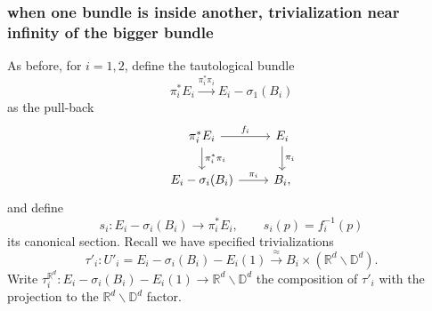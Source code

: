 \documentclass[11pt]{article}
\theoremstyle{definition}
\theoremstyle{remark}
\def\R{\mathbb{R}}
\def\D{\mathbb{D}}
\begin{document}
\subsubsection{when one bundle is inside another, trivialization near infinity of the bigger bundle}
\label{trivEI1_subsubsec}
As before, for $i=1,2$, define the tautological bundle 
$$\pi_i^*E_i\xrightarrow{\pi_i^*\pi_i}E_i-\sigma_1(B_i)$$
as the pull-back
\[
\begin{tikzcd}
\pi_i^*E_i \rar["f_i"] \dar["\pi_i^*\pi_i"] & E_i\dar["\pi_i"] \\
E_i-\sigma_i(B_i)\rar["\pi_i"] & B_i,
\end{tikzcd}
\]
and define 
$$s_i:E_i-\sigma_i(B_i)\to\pi_i^*E_i,\qquad s_i(p)=f_i^{-1}(p)$$
its canonical section. 
Recall we have specified trivializations 
$$\tau'_i:U'_i=E_i-\sigma_i(B_i)-E_i(1)\xrightarrow{\approx} B_i\times (\R^d\backslash\D^d).$$
Write $\tau^{\R^d}_i:E_i-\sigma_i(B_i)-E_i(1)\to\R^d\backslash\D^d$ the composition of $\tau'_i$ with the projection to the $\R^d\backslash\D^d$ factor. 
\end{document}
